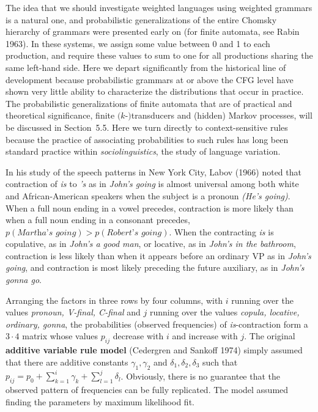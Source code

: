 The idea that we should investigate weighted languages using weighted grammars
is a natural one, and probabilistic generalizations of the entire Chomsky
hierarchy of grammars were presented early on (for finite automata, see Rabin
1963).\nocite{Rabin:1963} In these systems, we assign some value between 0 and
1 to each production, and require these values to sum to one for all
productions sharing the same left-hand side. Here we depart significantly from
the historical line of development because probabilistic grammars at or above
the CFG level have shown very little ability to characterize the distributions
that occur in practice. The probabilistic generalizations of finite automata
that are of practical and theoretical significance, finite $(k$-$)$transducers
and (hidden) Markov processes, will be discussed in Section~5.5. Here we turn
directly to context-sensitive rules because the practice of associating
probabilities to such rules has long been standard practice within {\it
  sociolinguistics}, the study of language variation. 

In his study of the speech patterns in New York City, Labov
(1966)\nocite{Labov:1966} noted that contraction of {\it is} to {\it 's} as in
{\it John's going} is almost universal among both white and African-American
speakers when the subject is a pronoun {\it (He's going)}.  When a full noun
ending in a vowel precedes, contraction is more likely than when a full noun
ending in a consonant precedes, $p(\textit{Martha's going}) >
p(\textit{Robert's going})$. When the contracting {\it is} is copulative, as
in {\it John's a good man}, or locative, as in {\it John's in the bathroom},
contraction is less likely than when it appears before an ordinary VP as in
{\it John's going}, and contraction is most likely preceding the future
auxiliary, as in {\it John's gonna go}.

Arranging the factors in three rows by four columns, with $i$ running over the
values {\it pronoun, V-final, C-final} and $j$ running over the values {\it
  copula, locative, ordinary, gonna}, the probabilities (observed frequencies)
of {\it is}-contraction form a $3 \cdot 4$ matrix whose values $p_{ij}$
decrease with $i$ and increase with $j$. The original {\bf additive variable
  rule model} (Cedergren and Sankoff 1974) simply assumed that there are
additive constants $\gamma_1, \gamma_2$ and $\delta_1, \delta_2, \delta_3$
such that $p_{ij} = p_0 + \sum_{k=1}^i \gamma_k + \sum_{l=1}^j
\delta_l$.  Obviously, there is no guarantee
that the observed pattern of frequencies can be fully replicated. The model
assumed finding the parameters by maximum likelihood fit.

